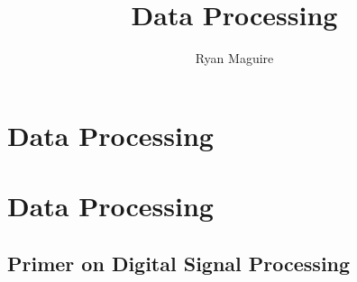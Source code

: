 \documentclass[crop=false,class=book,oneside]{standalone}
\begin{document}
    \ifx\ifplanetdiff\undefined
        \title{Data Processing}
        \author{Ryan Maguire}
        \date{\vspace{-5ex}}
        \maketitle
        \tableofcontents
        \clearpage
        \chapter*{Data Processing}
        \setcounter{chapter}{3}
    \else
        \chapter{Data Processing}
    \fi
    \section{Primer on Digital Signal Processing}
\end{document}
